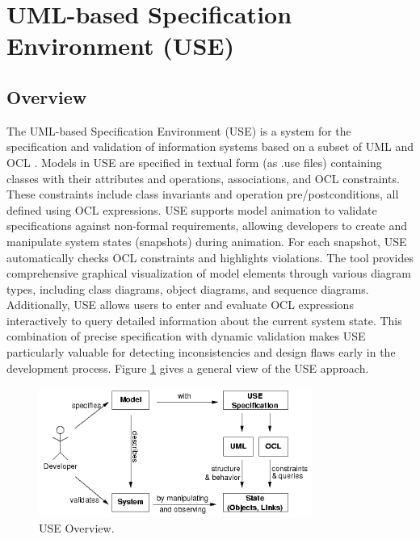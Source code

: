 \section{UML-based Specification Environment (USE)}

\subsection{Overview}
\hspace{1cm} The UML-based Specification Environment (USE) is a system for the specification and 
validation of information systems based on a subset of UML and OCL \cite{USE}. 
Models in USE are specified in textual form (as .use files) containing classes with 
their attributes and operations, associations, and OCL constraints. These constraints 
include class invariants and operation pre/postconditions, all defined using OCL 
expressions. USE supports model animation to validate specifications against 
non-formal requirements, allowing developers to create and manipulate system states 
(snapshots) during animation. For each snapshot, USE automatically checks OCL 
constraints and highlights violations. The tool provides comprehensive graphical 
visualization of model elements through various diagram types, including class 
diagrams, object diagrams, and sequence diagrams. Additionally, USE allows users 
to enter and evaluate OCL expressions interactively to query detailed information 
about the current system state. This combination of precise specification with 
dynamic validation makes USE particularly valuable for detecting inconsistencies 
and design flaws early in the development process. Figure \ref{fig:use_overview}
gives a general view of the USE approach.

\begin{figure}
    \centering
    \includegraphics[width=0.8\textwidth]{figures/c1/USE_Overview.png}
    \caption{USE Overview.}
    \label{fig:use_overview}
\end{figure}

